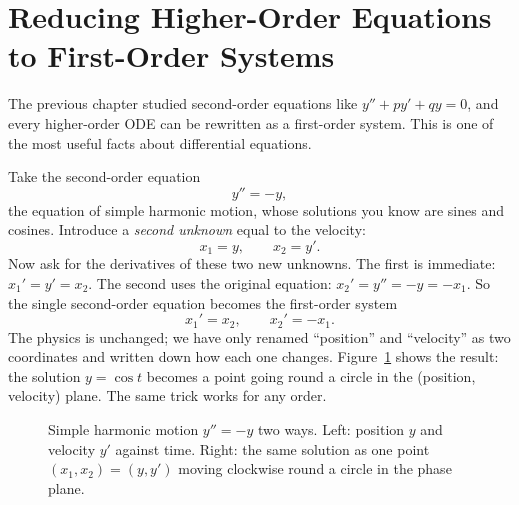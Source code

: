 \section{Reducing Higher-Order Equations to First-Order Systems}
\label{ch39:reduction}

The previous chapter studied second-order equations like $y'' + py' + qy = 0$,
and every higher-order ODE can be rewritten as a first-order system.
This is one of the most useful facts about differential equations.

Take the second-order equation
\[
  y'' = -y,
\]
the equation of simple harmonic motion, whose solutions you know are sines
and cosines. Introduce a \emph{second unknown} equal to the velocity:
\[
  x_1 = y, \qquad x_2 = y'.
\]
Now ask for the derivatives of these two new unknowns. The first is immediate:
$x_1' = y' = x_2$. The second uses the original equation: $x_2' = y'' = -y =
-x_1$. So the single second-order equation becomes the first-order system
\[
  x_1' = x_2, \qquad x_2' = -x_1.
\]
The physics is unchanged; we have only renamed ``position'' and
``velocity'' as two coordinates and written down how each one changes.
Figure~\ref{ch39:fig-shm-phase} shows the result: the solution
$y = \cos t$ becomes a point going round a circle in the
(position, velocity) plane. The same trick works for any order.

\begin{figure}[htbp]
\centering
{}
\caption{Simple harmonic motion $y''=-y$ two ways. Left: position $y$ and
velocity $y'$ against time. Right: the same solution as one point
$(x_1,x_2)=(y,y')$ moving clockwise round a circle in the phase plane.}
\label{ch39:fig-shm-phase}
\end{figure}

